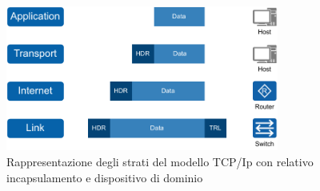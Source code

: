 \begin{figure}[H]
    \centering
    \includegraphics[width=0.8\textwidth]{immagini/diag2-modello_a_strati}
    \caption{Rappresentazione degli strati del modello TCP/Ip con relativo incapsulamento e dispositivo di dominio}
    \label{fig:modello-a-strati}
\end{figure}




